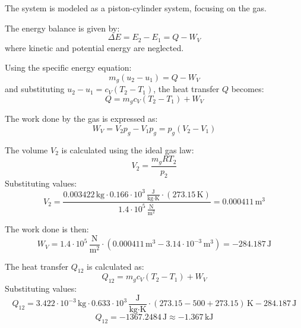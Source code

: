 The system is modeled as a piston-cylinder system, focusing on the gas.  

The energy balance is given by:  
\[
\Delta E = E_2 - E_1 = Q - W_V
\]  
where kinetic and potential energy are neglected.  

Using the specific energy equation:  
\[
m_g (u_2 - u_1) = Q - W_V
\]  
and substituting \( u_2 - u_1 = c_V (T_2 - T_1) \), the heat transfer \( Q \) becomes:  
\[
Q = m_g c_V (T_2 - T_1) + W_V
\]  

The work done by the gas is expressed as:  
\[
W_V = V_2 p_g - V_1 p_g = p_g (V_2 - V_1)
\]  

The volume \( V_2 \) is calculated using the ideal gas law:  
\[
V_2 = \frac{m_g R T_2}{p_2}
\]  
Substituting values:  
\[
V_2 = \frac{0.003422 \, \text{kg} \cdot 0.166 \cdot 10^3 \, \frac{\text{J}}{\text{kg·K}} \cdot (273.15 \, \text{K})}{1.4 \cdot 10^5 \, \frac{\text{N}}{\text{m}^2}} = 0.000411 \, \text{m}^3
\]  

The work done is then:  
\[
W_V = 1.4 \cdot 10^5 \, \frac{\text{N}}{\text{m}^2} \cdot (0.000411 \, \text{m}^3 - 3.14 \cdot 10^{-3} \, \text{m}^3) = -284.187 \, \text{J}
\]  

The heat transfer \( Q_{12} \) is calculated as:  
\[
Q_{12} = m_g c_V (T_2 - T_1) + W_V
\]  
Substituting values:  
\[
Q_{12} = 3.422 \cdot 10^{-3} \, \text{kg} \cdot 0.633 \cdot 10^3 \, \frac{\text{J}}{\text{kg·K}} \cdot (273.15 - 500 + 273.15) \, \text{K} - 284.187 \, \text{J}
\]  
\[
Q_{12} = -1367.2484 \, \text{J} \approx -1.367 \, \text{kJ}
\]